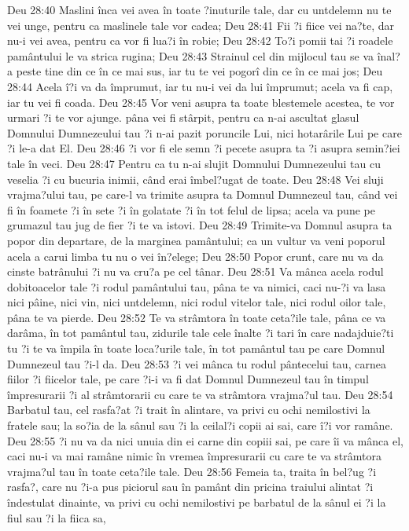 Deu 28:40  Maslini înca vei avea în toate ?inuturile tale, dar cu untdelemn nu te vei unge, pentru ca maslinele tale vor cadea;
Deu 28:41  Fii ?i fiice vei na?te, dar nu-i vei avea, pentru ca vor fi lua?i în robie;
Deu 28:42  To?i pomii tai ?i roadele pamântului le va strica rugina;
Deu 28:43  Strainul cel din mijlocul tau se va înal?a peste tine din ce în ce mai sus, iar tu te vei pogorî din ce în ce mai jos;
Deu 28:44  Acela î?i va da împrumut, iar tu nu-i vei da lui împrumut; acela va fi cap, iar tu vei fi coada.
Deu 28:45  Vor veni asupra ta toate blestemele acestea, te vor urmari ?i te vor ajunge. pâna vei fi stârpit, pentru ca n-ai ascultat glasul Domnului Dumnezeului tau ?i n-ai pazit poruncile Lui, nici hotarârile Lui pe care ?i le-a dat El.
Deu 28:46  ?i vor fi ele semn ?i pecete asupra ta ?i asupra semin?iei tale în veci.
Deu 28:47  Pentru ca tu n-ai slujit Domnului Dumnezeului tau cu veselia ?i cu bucuria inimii, când erai îmbel?ugat de toate.
Deu 28:48  Vei sluji vrajma?ului tau, pe care-l va trimite asupra ta Domnul Dumnezeul tau, când vei fi în foamete ?i în sete ?i în golatate ?i în tot felul de lipsa; acela va pune pe grumazul tau jug de fier ?i te va istovi.
Deu 28:49  Trimite-va Domnul asupra ta popor din departare, de la marginea pamântului; ca un vultur va veni poporul acela a carui limba tu nu o vei în?elege;
Deu 28:50  Popor crunt, care nu va da cinste batrânului ?i nu va cru?a pe cel tânar.
Deu 28:51  Va mânca acela rodul dobitoacelor tale ?i rodul pamântului tau, pâna te va nimici, caci nu-?i va lasa nici pâine, nici vin, nici untdelemn, nici rodul vitelor tale, nici rodul oilor tale, pâna te va pierde.
Deu 28:52  Te va strâmtora în toate ceta?ile tale, pâna ce va darâma, în tot pamântul tau, zidurile tale cele înalte ?i tari în care nadajduie?ti tu ?i te va împila în toate loca?urile tale, în tot pamântul tau pe care Domnul Dumnezeul tau ?i-l da.
Deu 28:53  ?i vei mânca tu rodul pântecelui tau, carnea fiilor ?i fiicelor tale, pe care ?i-i va fi dat Domnul Dumnezeul tau în timpul împresurarii ?i al strâmtorarii cu care te va strâmtora vrajma?ul tau.
Deu 28:54  Barbatul tau, cel rasfa?at ?i trait în alintare, va privi cu ochi nemilostivi la fratele sau; la so?ia de la sânul sau ?i la ceilal?i copii ai sai, care î?i vor ramâne.
Deu 28:55  ?i nu va da nici unuia din ei carne din copiii sai, pe care îi va mânca el, caci nu-i va mai ramâne nimic în vremea împresurarii cu care te va strâmtora vrajma?ul tau în toate ceta?ile tale.
Deu 28:56  Femeia ta, traita în bel?ug ?i rasfa?, care nu ?i-a pus piciorul sau în pamânt din pricina traiului alintat ?i îndestulat dinainte, va privi cu ochi nemilostivi pe barbatul de la sânul ei ?i la fiul sau ?i la fiica sa,
